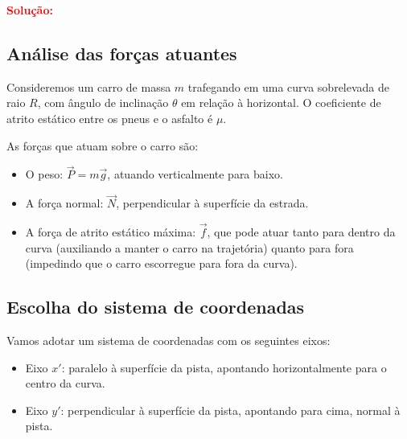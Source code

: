 \documentclass[a4paper,12pt]{article}
\begin{document}
\begin{flushleft}

\textcolor{red}{\textbf{Solução:}}\\

\subsection*{Análise das forças atuantes}

Consideremos um carro de massa \( m \) trafegando em uma curva sobrelevada de raio \( R \), com ângulo de inclinação \(\theta\) em relação à horizontal. O coeficiente de atrito estático entre os pneus e o asfalto é \(\mu\).

As forças que atuam sobre o carro são:

\begin{itemize}
  \item O peso: \( \vec{P} = m\vec{g} \), atuando verticalmente para baixo.
  \item A força normal: \( \vec{N} \), perpendicular à superfície da estrada.
  \item A força de atrito estático máxima: \( \vec{f} \), que pode atuar tanto para dentro da curva (auxiliando a manter o carro na trajetória) quanto para fora (impedindo que o carro escorregue para fora da curva).
\end{itemize}

\subsection*{Escolha do sistema de coordenadas}

Vamos adotar um sistema de coordenadas com os seguintes eixos:

\begin{itemize}
  \item Eixo \( x' \): paralelo à superfície da pista, apontando horizontalmente para o centro da curva.
  \item Eixo \( y' \): perpendicular à superfície da pista, apontando para cima, normal à pista.
\end{itemize}


\end{flushleft}
\end{document}
